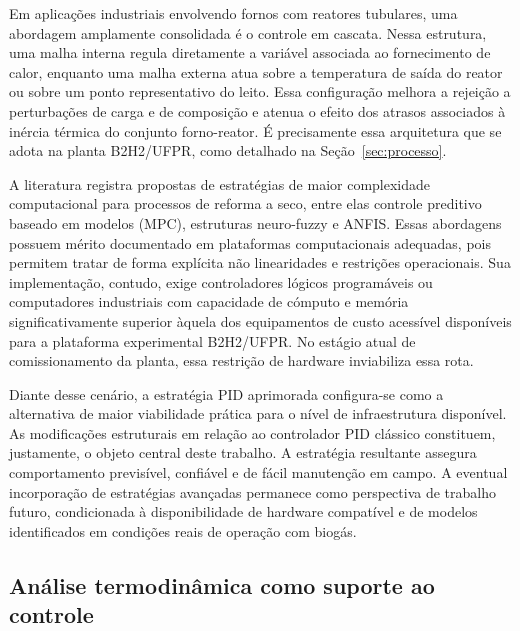 Em aplicações industriais envolvendo fornos com reatores tubulares, uma
abordagem amplamente consolidada é o controle em cascata. Nessa estrutura,
uma malha interna regula diretamente a variável associada ao fornecimento
de calor, enquanto uma malha externa atua sobre a temperatura de saída do
reator ou sobre um ponto representativo do leito.\citep{luyben2014} Essa
configuração melhora a rejeição a perturbações de carga e de composição
e atenua o efeito dos atrasos associados à inércia térmica do conjunto
forno-reator. É precisamente essa arquitetura que se adota na planta B2H2/UFPR,
como detalhado na Seção~\ref{sec:processo}.

A literatura registra propostas de estratégias de maior complexidade
computacional para processos de reforma a seco, entre elas controle preditivo
baseado em modelos (MPC), estruturas neuro-fuzzy e ANFIS.\citep{essien2019}
Essas abordagens possuem mérito documentado em plataformas computacionais
adequadas, pois permitem tratar de forma explícita não linearidades e
restrições operacionais. Sua implementação, contudo, exige controladores
lógicos programáveis ou computadores industriais com capacidade de cómputo
e memória significativamente superior àquela dos equipamentos de custo
acessível disponíveis para a plataforma experimental B2H2/UFPR. No estágio
atual de comissionamento da planta, essa restrição de hardware inviabiliza
essa rota.\citep{essien2019,luyben2014}

Diante desse cenário, a estratégia PID aprimorada configura-se como a
alternativa de maior viabilidade prática para o nível de infraestrutura
disponível. As modificações estruturais em relação ao controlador PID
clássico constituem, justamente, o objeto central deste trabalho. A
estratégia resultante assegura comportamento previsível, confiável e de
fácil manutenção em campo. A eventual incorporação de estratégias avançadas
permanece como perspectiva de trabalho futuro, condicionada à disponibilidade
de hardware compatível e de modelos identificados em condições reais de
operação com biogás.\citep{essien2019}

\subsection{Análise termodinâmica como suporte ao controle}
\label{sec:revisao}

